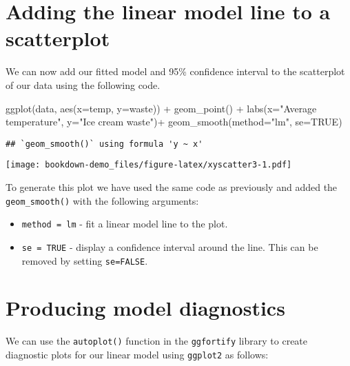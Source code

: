 \documentclass[
]{book}
\newenvironment{Shaded}{\begin{snugshade}}{\end{snugshade}}
\newcommand{\AttributeTok}[1]{\textcolor[rgb]{0.77,0.63,0.00}{#1}}
\newcommand{\ConstantTok}[1]{\textcolor[rgb]{0.00,0.00,0.00}{#1}}
\newcommand{\FunctionTok}[1]{\textcolor[rgb]{0.00,0.00,0.00}{#1}}
\newcommand{\NormalTok}[1]{#1}
\newcommand{\SpecialCharTok}[1]{\textcolor[rgb]{0.00,0.00,0.00}{#1}}
\newcommand{\StringTok}[1]{\textcolor[rgb]{0.31,0.60,0.02}{#1}}
\providecommand{\tightlist}{%
  \setlength{\itemsep}{0pt}\setlength{\parskip}{0pt}}
\begin{document}
\hypertarget{adding-the-linear-model-line-to-a-scatterplot}{%
\section{Adding the linear model line to a scatterplot}\label{adding-the-linear-model-line-to-a-scatterplot}}

We can now add our fitted model and 95\% confidence interval to the scatterplot of our data using the following code.

\begin{Shaded}
\begin{Highlighting}[]
\FunctionTok{ggplot}\NormalTok{(data, }\FunctionTok{aes}\NormalTok{(}\AttributeTok{x=}\NormalTok{temp, }\AttributeTok{y=}\NormalTok{waste)) }\SpecialCharTok{+} 
  \FunctionTok{geom\_point}\NormalTok{() }\SpecialCharTok{+} 
  \FunctionTok{labs}\NormalTok{(}\AttributeTok{x=}\StringTok{"Average temperature"}\NormalTok{, }\AttributeTok{y=}\StringTok{"Ice cream waste"}\NormalTok{)}\SpecialCharTok{+}
  \FunctionTok{geom\_smooth}\NormalTok{(}\AttributeTok{method=}\StringTok{"lm"}\NormalTok{, }\AttributeTok{se=}\ConstantTok{TRUE}\NormalTok{)}
\end{Highlighting}
\end{Shaded}

\begin{verbatim}
## `geom_smooth()` using formula 'y ~ x'
\end{verbatim}

\texttt{[image: bookdown-demo\_files/figure-latex/xyscatter3-1.pdf]}

To generate this plot we have used the same code as previously and added the \texttt{geom\_smooth()} with the following arguments:

\begin{itemize}
\tightlist
\item
  \texttt{method\ =\ lm} - fit a linear model line to the plot.
\item
  \texttt{se\ =\ TRUE} - display a confidence interval around the line. This can be removed by setting \texttt{se=FALSE}.
\end{itemize}

\hypertarget{producing-model-diagnostics}{%
\section{Producing model diagnostics}\label{producing-model-diagnostics}}

We can use the \texttt{autoplot()} function in the \texttt{ggfortify} library to create diagnostic plots for our linear model using \texttt{ggplot2} as follows:
\end{document}
